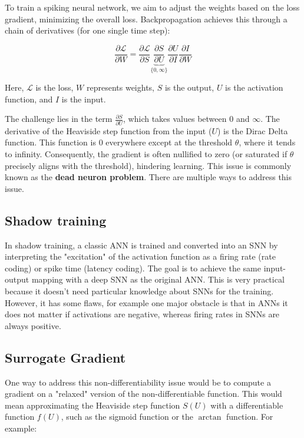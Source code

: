 \documentclass[11pt]{article}
\begin{document}
To train a spiking neural network, we aim to adjust the weights based on the loss gradient, minimizing the overall loss. Backpropagation achieves this through a chain of derivatives (for one single time step):

\begin{equation}
  \frac{\partial \mathcal{L}}{\partial W} =
  \frac{\partial \mathcal{L}}{\partial S}
  \underbrace{\frac{\partial S}{\partial U}}_{\{0, \infty\}}
  \frac{\partial U}{\partial I}
  \frac{\partial I}{\partial W}
\end{equation}

Here, $\mathcal{L}$ is the loss, $W$ represents weights, $S$ is the output, $U$ is the activation function, and $I$ is the input.

The challenge lies in the term $\frac{\partial S}{\partial U}$, which takes values between $0$ and $\infty$. The derivative of the Heaviside step function from the input ($U$) is the Dirac Delta function. This function is $0$ everywhere except at the threshold $\theta$, where it tends to infinity. Consequently, the gradient is often nullified to zero (or saturated if $\theta$ precisely aligns with the threshold), hindering learning. This issue is commonly known as the \textbf{dead neuron problem}. There are multiple ways to address this issue.

\subsection{Shadow training}

In shadow training, a classic ANN is trained and converted into an SNN by interpreting the "excitation" of the activation function as a firing rate (rate coding) or spike time (latency coding). The goal is to achieve the same input-output mapping with a deep SNN as the original ANN. This is very practical because it doesn't need particular knowledge about SNNs for the training. However, it has some flaws, for example one major obstacle is that in ANNs it does not matter if activations are negative, whereas firing rates in SNNs are always positive.\cite{pfeiffer2018}

\subsection{Surrogate Gradient}

One way to address this non-differentiability issue would be to compute a gradient on a "relaxed" version of the non-differentiable function. This would mean approximating the Heaviside step function $S(U)$ with a differentiable function $f(U)$, such as the sigmoid function or the $\arctan$ function. For example:
\end{document}

